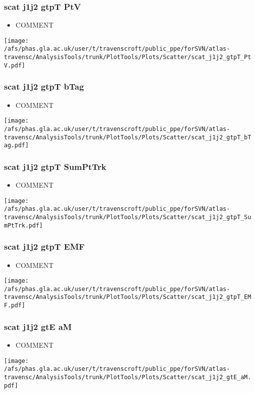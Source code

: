 \documentclass{beamer}
\begin{document}
\begin{frame}
\frametitle{scat j1j2 gtpT PtV}
\begin{itemize}
\item COMMENT
\end{itemize}
\begin{center}
\texttt{[image: /afs/phas.gla.ac.uk/user/t/travenscroft/public\_ppe/forSVN/atlas-travensc/AnalysisTools/trunk/PlotTools/Plots/Scatter/scat\_j1j2\_gtpT\_PtV.pdf]}
\end{center}
\end{frame}

\begin{frame}
\frametitle{scat j1j2 gtpT bTag}
\begin{itemize}
\item COMMENT
\end{itemize}
\begin{center}
\texttt{[image: /afs/phas.gla.ac.uk/user/t/travenscroft/public\_ppe/forSVN/atlas-travensc/AnalysisTools/trunk/PlotTools/Plots/Scatter/scat\_j1j2\_gtpT\_bTag.pdf]}
\end{center}
\end{frame}

\begin{frame}
\frametitle{scat j1j2 gtpT SumPtTrk}
\begin{itemize}
\item COMMENT
\end{itemize}
\begin{center}
\texttt{[image: /afs/phas.gla.ac.uk/user/t/travenscroft/public\_ppe/forSVN/atlas-travensc/AnalysisTools/trunk/PlotTools/Plots/Scatter/scat\_j1j2\_gtpT\_SumPtTrk.pdf]}
\end{center}
\end{frame}

\begin{frame}
\frametitle{scat j1j2 gtpT EMF}
\begin{itemize}
\item COMMENT
\end{itemize}
\begin{center}
\texttt{[image: /afs/phas.gla.ac.uk/user/t/travenscroft/public\_ppe/forSVN/atlas-travensc/AnalysisTools/trunk/PlotTools/Plots/Scatter/scat\_j1j2\_gtpT\_EMF.pdf]}
\end{center}
\end{frame}

\begin{frame}
\frametitle{scat j1j2 gtE aM}
\begin{itemize}
\item COMMENT
\end{itemize}
\begin{center}
\texttt{[image: /afs/phas.gla.ac.uk/user/t/travenscroft/public\_ppe/forSVN/atlas-travensc/AnalysisTools/trunk/PlotTools/Plots/Scatter/scat\_j1j2\_gtE\_aM.pdf]}
\end{center}
\end{frame}
\end{document}
